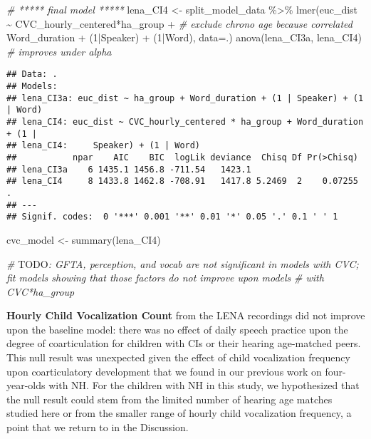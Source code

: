 \documentclass[
]{article}
\newenvironment{Shaded}{\begin{snugshade}}{\end{snugshade}}
\newcommand{\AlertTok}[1]{\textcolor[rgb]{0.94,0.16,0.16}{#1}}
\newcommand{\AttributeTok}[1]{\textcolor[rgb]{0.77,0.63,0.00}{#1}}
\newcommand{\CommentTok}[1]{\textcolor[rgb]{0.56,0.35,0.01}{\textit{#1}}}
\newcommand{\DecValTok}[1]{\textcolor[rgb]{0.00,0.00,0.81}{#1}}
\newcommand{\FunctionTok}[1]{\textcolor[rgb]{0.00,0.00,0.00}{#1}}
\newcommand{\NormalTok}[1]{#1}
\newcommand{\OtherTok}[1]{\textcolor[rgb]{0.56,0.35,0.01}{#1}}
\newcommand{\SpecialCharTok}[1]{\textcolor[rgb]{0.00,0.00,0.00}{#1}}
\begin{document}
\begin{Shaded}
\begin{Highlighting}[]
\CommentTok{\# ***** final model *****}
\NormalTok{lena\_CI4 }\OtherTok{\textless{}{-}}\NormalTok{ split\_model\_data }\SpecialCharTok{\%\textgreater{}\%}
  \FunctionTok{lmer}\NormalTok{(euc\_dist }\SpecialCharTok{\textasciitilde{}}\NormalTok{ CVC\_hourly\_centered}\SpecialCharTok{*}\NormalTok{ha\_group }\SpecialCharTok{+} \CommentTok{\# exclude chrono age because correlated}
\NormalTok{         Word\_duration }\SpecialCharTok{+} 
\NormalTok{         (}\DecValTok{1}\SpecialCharTok{|}\NormalTok{Speaker) }\SpecialCharTok{+} 
\NormalTok{         (}\DecValTok{1}\SpecialCharTok{|}\NormalTok{Word), }
       \AttributeTok{data=}\NormalTok{.) }
\FunctionTok{anova}\NormalTok{(lena\_CI3a, lena\_CI4) }\CommentTok{\# improves under alpha}
\end{Highlighting}
\end{Shaded}

\begin{verbatim}
## Data: .
## Models:
## lena_CI3a: euc_dist ~ ha_group + Word_duration + (1 | Speaker) + (1 | Word)
## lena_CI4: euc_dist ~ CVC_hourly_centered * ha_group + Word_duration + (1 | 
## lena_CI4:     Speaker) + (1 | Word)
##           npar    AIC    BIC  logLik deviance  Chisq Df Pr(>Chisq)  
## lena_CI3a    6 1435.1 1456.8 -711.54   1423.1                       
## lena_CI4     8 1433.8 1462.8 -708.91   1417.8 5.2469  2    0.07255 .
## ---
## Signif. codes:  0 '***' 0.001 '**' 0.01 '*' 0.05 '.' 0.1 ' ' 1
\end{verbatim}

\begin{Shaded}
\begin{Highlighting}[]
\NormalTok{cvc\_model }\OtherTok{\textless{}{-}} \FunctionTok{summary}\NormalTok{(lena\_CI4)}


\CommentTok{\# }\AlertTok{TODO}\CommentTok{: GFTA, perception, and vocab are not significant in models with CVC; fit models showing that those factors do not improve upon models}
\CommentTok{\# with CVC*ha\_group}
\end{Highlighting}
\end{Shaded}

\textbf{Hourly Child Vocalization Count} from the LENA recordings did not improve upon the baseline model: there was no effect of daily speech practice upon the degree of coarticulation for children with CIs or their hearing age-matched peers. This null result was unexpected given the effect of child vocalization frequency upon coarticulatory development that we found in our previous work on four-year-olds with NH. For the children with NH in this study, we hypothesized that the null result could stem from the limited number of hearing age matches studied here or from the smaller range of hourly child vocalization frequency, a point that we return to in the Discussion.
\end{document}
